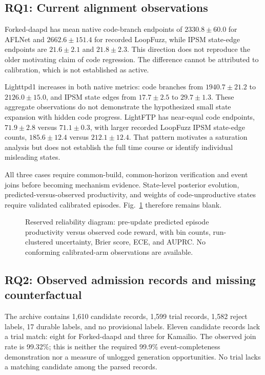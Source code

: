 \documentclass[final,5p,times,number]{elsarticle}
\newcommand{\blankpanel}[1]{\fbox{\begin{minipage}[c][#1][c]{0.93\linewidth}\mbox{}\end{minipage}}}
\newcommand{\figref}[1]{Fig.~\ref{#1}}
\begin{document}
\subsection{RQ1: Current alignment observations}
Forked-daapd has mean native code-branch endpoints of $2330.8\pm60.0$ for AFLNet and $2662.6\pm151.4$ for recorded LoopFuzz, while IPSM state-edge endpoints are $21.6\pm2.1$ and $21.8\pm2.3$. This direction does not reproduce the older motivating claim of code regression. The difference cannot be attributed to calibration, which is not established as active.

Lighttpd1 increases in both native metrics: code branches from $1940.7\pm21.2$ to $2126.0\pm15.0$, and IPSM state edges from $17.7\pm2.5$ to $29.7\pm1.3$. These aggregate observations do not demonstrate the hypothesized small state expansion with hidden code progress. LightFTP has near-equal code endpoints, $71.9\pm2.8$ versus $71.1\pm0.3$, with larger recorded LoopFuzz IPSM state-edge counts, $185.6\pm12.4$ versus $212.1\pm12.4$. That pattern motivates a saturation analysis but does not establish the full time course or identify individual misleading states.

All three cases require common-build, common-horizon verification and event joins before becoming mechanism evidence. State-level posterior evolution, predicted-versus-observed productivity, and weights of code-unproductive states require validated calibrated episodes. \figref{fig:reliability} therefore remains blank.

\begin{figure}[t]
\centering\blankpanel{28mm}
\caption{Reserved reliability diagram: pre-update predicted episode productivity versus observed code reward, with bin counts, run-clustered uncertainty, Brier score, ECE, and AUPRC. No conforming calibrated-arm observations are available.}
\label{fig:reliability}
\end{figure}

\subsection{RQ2: Observed admission records and missing counterfactual}
The archive contains 1,610 candidate records, 1,599 trial records, 1,582 reject labels, 17 durable labels, and no provisional labels. Eleven candidate records lack a trial match: eight for Forked-daapd and three for Kamailio. The observed join rate is 99.32\%; this is neither the required 99.9\% event-completeness demonstration nor a measure of unlogged generation opportunities. No trial lacks a matching candidate among the parsed records.
\end{document}
